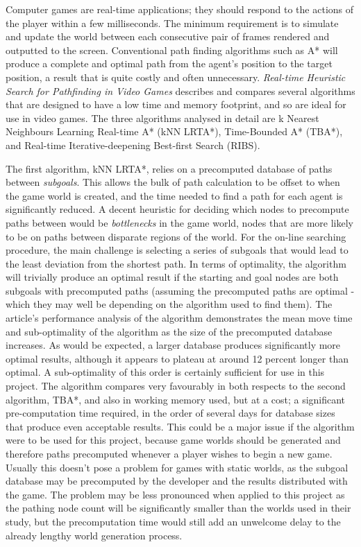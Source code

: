 \documentclass[12pt,a4paper]{article}
\begin{document}
Computer games are real-time applications; they should respond to the actions of the player within a few milliseconds. The minimum requirement is to simulate and update the world between each consecutive pair of frames rendered and outputted to the screen. Conventional path finding algorithms such as A* will produce a complete and optimal path from the agent's position to the target position, a result that is quite costly and often unnecessary. \emph{Real-time Heuristic Search for Pathfinding in Video Games}\cite{bulitko10} describes and compares several algorithms that are designed to have a low time and memory footprint, and so are ideal for use in video games. The three algorithms analysed in detail are k Nearest Neighbours Learning Real-time A* (kNN LRTA*), Time-Bounded A* (TBA*), and Real-time Iterative-deepening Best-first Search (RIBS).

The first algorithm, kNN LRTA*, relies on a precomputed database of paths between \emph{subgoals}. This allows the bulk of path calculation to be offset to when the game world is created, and the time needed to find a path for each agent is significantly reduced. A decent heuristic for deciding which nodes to precompute paths between would be \emph{bottlenecks} in the game world, nodes that are more likely to be on paths between disparate regions of the world. For the on-line searching procedure, the main challenge is selecting a series of subgoals that would lead to the least deviation from the shortest path. In terms of optimality, the algorithm will trivially produce an optimal result if the starting and goal nodes are both subgoals with precomputed paths (assuming the precomputed paths are optimal - which they may well be depending on the algorithm used to find them). The article's performance analysis of the algorithm demonstrates the mean move time and sub-optimality of the algorithm as the size of the precomputed database increases. As would be expected, a larger database produces significantly more optimal results, although it appears to plateau at around 12 percent longer than optimal. A sub-optimality of this order is certainly sufficient for use in this project. The algorithm compares very favourably in both respects to the second algorithm, TBA*, and also in working memory used, but at a cost; a significant pre-computation time required, in the order of several days for database sizes that produce even acceptable results. This could be a major issue if the algorithm were to be used for this project, because game worlds should be generated and therefore paths precomputed whenever a player wishes to begin a new game. Usually this doesn't pose a problem for games with static worlds, as the subgoal database may be precomputed by the developer and the results distributed with the game. The problem may be less pronounced when applied to this project as the pathing node count will be significantly smaller than the worlds used in their study, but the precomputation time would still add an unwelcome delay to the already lengthy world generation process.
\end{document}
